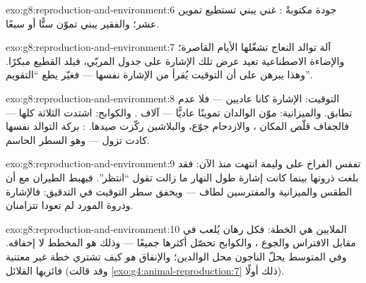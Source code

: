 \begin{solution}{exo:g8:reproduction-and-environment:6}
جودة  مكتوبةً :  غني  يبني  تستطيع
تموين عشر؛ والفقير يبني  تموّن ستًّا أو سبعًا.
\end{solution}

\begin{solution}{exo:g8:reproduction-and-environment:7}
آلة توالد النعاج تشغّلها الأيام القاصرة؛ والإضاءة الاصطناعية تعيد
عرض تلك الإشارة على جدول المربّي، فيلد القطيع مبكرًا. وهذا يبرهن
على أن التوقيت يُقرأ من الإشارة نفسها --- فغيّر  يطع
``التقويم''.
\end{solution}

\begin{solution}{exo:g8:reproduction-and-environment:8}
التوقيت: الإشارة  كانا عاديين --- فلا عدم تطابق. والميزانية:
موّن الوالدان تموينًا عاديًّا --- آلاف . والكوابح: اشتدت
الثلاثة كلها --- فالجفاف قلّص المكان ، والازدحام جوّع،
والبلاشين ركّزت صيدها. : بركة التوالد نفسها كادت تزول ---
وهو السطر الحاسم.
\end{solution}

\begin{solution}{exo:g8:reproduction-and-environment:9}
تفقس الفراخ على وليمة انتهت منذ الآن: فقد بلغت  ذروتها
بينما كانت إشارة طول النهار ما زالت تقول ``انتظر''. فيهبط الطيران
مع أن الطقس والميزانية والمفترسين لطاف --- ويخفق سطر التوقيت في
التدقيق: فالإشارة وذروة المورد لم تعودا تتزامنان.
\end{solution}

\begin{solution}{exo:g8:reproduction-and-environment:10}
الملايين هي الخطة: فكل  رهان يُلعب في مقابل الافتراس والجوع
، والكوابح تحصّل أكثرها جميعًا --- وذلك هو المخطط لا إخفاقه.
وفي المتوسط يحلّ الناجون محل الوالدين؛ والإنفاق \emph{هو} كيف
تشتري خطة غير معتنية فائزيها القلائل
(وقد قالت \cref{exo:g4:animal-reproduction:7} ذلك أولًا).
\end{solution}

